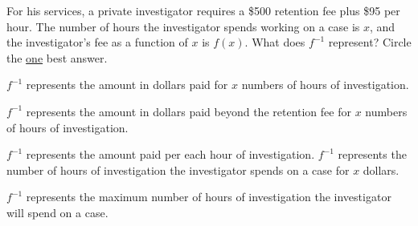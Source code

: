 \documentclass[11pt,answers]{exam}
\begin{document}
\begin{questions}
\question[1] For his services, a private investigator requires a \$500 retention fee plus \$95 per hour. The number of hours the investigator spends working on a case is $x$, and the
investigator's fee as a function of $x$ is $f(x)$. What does 
$\displaystyle f^{-1}$ represent? Circle the {\underline{one}} best answer.

\begin{choices}
\choice $\displaystyle f^{-1}$ represents the amount in dollars paid for $x$ numbers of hours of investigation.
 
\choice $\displaystyle f^{-1}$ represents the amount in dollars paid beyond the retention fee for $x$ numbers of hours of investigation.
    

\choice $\displaystyle f^{-1}$ represents the amount paid per each hour of investigation.
\choice $\displaystyle f^{-1}$ represents the number of hours of investigation the investigator spends on a case for $x$ dollars.
 
\choice $\displaystyle f^{-1}$ represents the maximum number of hours of investigation the investigator will spend on a case.
 

\end{choices}

\end{questions}
\end{document}
